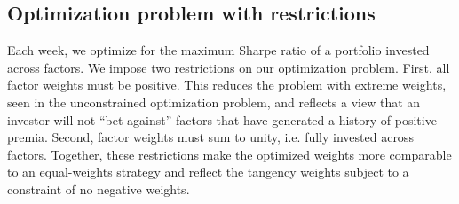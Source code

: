 

\subsection{Optimization problem with restrictions}

Each week, we optimize for the maximum Sharpe ratio of a portfolio invested across factors. We impose two restrictions on our optimization problem. First, all factor weights must be positive. This reduces the problem with extreme weights, seen in the unconstrained optimization problem, and reflects a view that an investor will not ``bet against'' factors that have generated a history of positive premia. Second, factor weights must sum to unity, i.e. fully invested across factors. Together, these restrictions make the optimized weights more comparable to an equal-weights strategy and reflect the tangency weights subject to a constraint of no negative weights.

